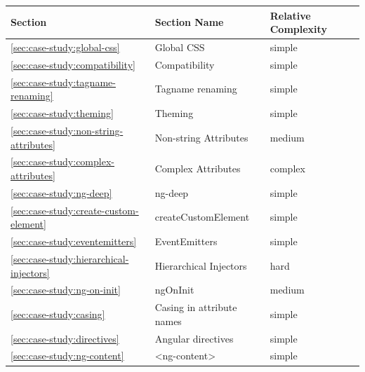 \begin{table}[h]
  \begin{tabularx}{\textwidth}{|l|X|l|}
    \toprule
    \textbf{Section}                            & \textbf{Section Name}              & \textbf{Relative Complexity} \\ \midrule
    \ref{sec:case-study:global-css}             & Global CSS                         & simple                       \\ \hline
    \ref{sec:case-study:compatibility}          & Compatibility                      & simple                       \\ \hline
    \ref{sec:case-study:tagname-renaming}       & Tagname renaming                   & simple                       \\ \hline
    \ref{sec:case-study:theming}                & Theming                            & simple                       \\ \hline
    \ref{sec:case-study:non-string-attributes}  & Non-string Attributes              & medium                       \\ \hline
    \ref{sec:case-study:complex-attributes}     & Complex Attributes                 & complex                      \\ \hline
    \ref{sec:case-study:ng-deep}                & ng-deep                            & simple                       \\ \hline
    \ref{sec:case-study:create-custom-element}  & createCustomElement                & simple                       \\ \hline
    \ref{sec:case-study:eventemitters}          & EventEmitters                      & simple                       \\ \hline
    \ref{sec:case-study:hierarchical-injectors} & Hierarchical Injectors             & hard                         \\ \hline
    \ref{sec:case-study:ng-on-init}             & ngOnInit                           & medium                       \\ \hline
    \ref{sec:case-study:casing}                 & Casing in attribute names          & simple                       \\ \hline
    \ref{sec:case-study:directives}             & Angular directives                 & simple                       \\ \hline
    \ref{sec:case-study:ng-content}             & <ng-content>                       & simple                       \\ \hline

\end{tabularx}
\end{table}

